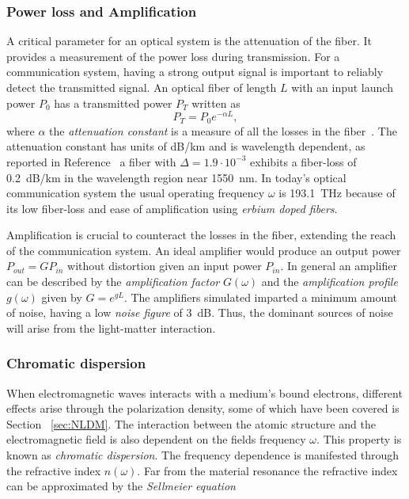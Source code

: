 \subsubsection{Power loss and Amplification}
A critical parameter for an optical system is the attenuation of the fiber. It provides a measurement of the power loss during transmission. For a communication system, having a strong output signal is important to reliably detect the transmitted signal. An optical fiber of length $L$ with an input launch power $P_0$ has a transmitted power $P_T$ written as 
\begin{equation}
P_T=P_0e^{-\alpha L},
\end{equation}
where $\alpha$ the \emph{attenuation constant} is a measure of all the losses in the fiber~\cite{agrawal2000nonlinear}. The attenuation constant has units of dB/km and is wavelength dependent, as reported in Reference~\cite{miya1979ultimate} a fiber with $\Delta=1.9\cdot10^{-3}$ exhibits a fiber-loss of 0.2~dB/km in the wavelength region near 1550~nm. In today's optical communication system the usual operating frequency $\omega$ is 193.1~THz because of its low fiber-loss and ease of amplification using \textit{erbium doped fibers}.

Amplification is crucial to counteract the losses in the fiber, extending the reach of the communication system. An ideal amplifier would produce an output power $P_{out} = G P_{in}$ without distortion given an input power $P_{in}$. In general an amplifier can be described by the  \textit{amplification factor} $G(\omega)$ and the \textit{amplification profile} $g(\omega)$ given by $G=e^{gL}$. The amplifiers simulated imparted a minimum amount of noise, having a low \textit{noise figure} of 3~dB. Thus, the dominant sources of noise will arise from the light-matter interaction.



\subsubsection{Chromatic dispersion}\label{sec:CD}

When electromagnetic waves interacts with a medium's bound electrons, different effects arise through the polarization density, some of which have been covered is Section~ \ref{sec:NLDM}. The interaction between the atomic structure and the electromagnetic field is also dependent on the fields frequency $\omega$. This property is known as \textit{chromatic dispersion}. The frequency dependence is manifested through the refractive index $n(\omega)$. Far from the material resonance the refractive index can be approximated by the \emph{Sellmeier equation}~\cite{agrawal2000nonlinear,FiberAgrawal}

